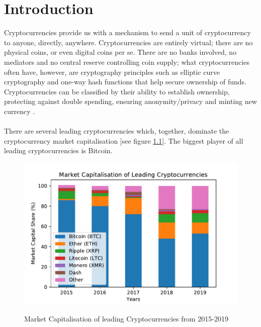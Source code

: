 \chapter{Introduction}
Cryptocurrencies provide us with a mechanism to send a unit of cryptocurrency to anyone, directly, anywhere. Cryptocurrencies are entirely virtual; there are no physical coins, or even digital coins per se. There are no banks involved, no mediators and no central reserve controlling coin supply; what cryptocurrencies often have, however, are cryptography principles such as elliptic curve cryptography and one-way hash functions that help secure ownership of funds. Cryptocurrencies can be classified by their ability to establish ownership, protecting against double spending, ensuring anonymity/privacy and minting new currency \cite{RefWorks:doc:5cfe1c72e4b096a2b4747aac}. 
\\\\
There are several leading cryptocurrencies which, together, dominate the cryptocurrency market capitalisation [see figure \ref{fig:cryptocurrency-capitalisaiton}]. The biggest player of all leading cryptocurrencies is Bitcoin. 

\begin{figure}[h!]
  \centering
  \includegraphics[width = 12cm]{./figures/marketcapitalisation.pdf}\\[0.5cm] 
  \caption{Market Capitalisation of leading Cryptocurrencies from 2015-2019  \cite{RefWorks:doc:5cfe03c0e4b091a4a00f7e76}}
  \label{fig:cryptocurrency-capitalisaiton}
\end{figure}



